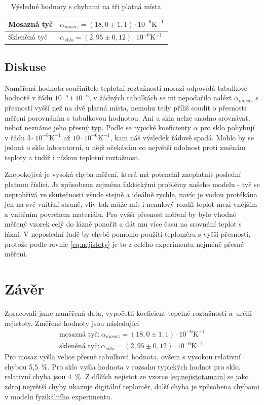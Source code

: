 \documentclass[a4paper,12pt]{article}   %
\begin{document}
\begin{table}[htbp]
  \centering
  \begin{tabular}{|l|l|}
    \hline
    Mosazná tyč & $\alpha_{mosaz} = (18,0 \pm 1,1) \cdot 10^{-6} \text{K}^{-1}$\\\hline
    Skleněná tyč & $\alpha_{sklo} = (2,95 \pm 0,12) \cdot 10^{-6} \text{K}^{-1}$\\\hline
  \end{tabular}
  \caption{Výsledné hodnoty s chybami na tři platná místa}
  \label{tab:final}
\end{table}

\subsection{Diskuse}
\label{ch:diskuze}
Naměřená hodnota součinitele teplotní roztažnosti mosazi odpovídá tabulkové hodnotě v řádu $10^{-5}$ i $10^{-6}$, v žádných tabulkách se mi nepodařilo nalézt $\alpha_{mosaz}$ s přesností vyšší než na dvě platná místa, nemohu tedy příliš soudit o přesnosti měření porovnáním s tabulkovou hodnotou. Ani u skla nelze snadno srovnávat, neboť neznáme jeho přesný typ. Podle \cite{url:sklo} se typické koeficienty $\alpha$ pro sklo pohybují v řádu $3\cdot 10^{-6} \text{K}^{-1}$ až $10 \cdot 10^{-6}\text{K}^{-1}$, kam náš výsledek řádově spadá. Mohlo by se jednat o sklo laboratorní, u nějž očekávám co největší odolnost proti změnám teploty a tudíž i nízkou teplotní roztažnost.

Znepokojivá je vysoká chyba měření, která má potenciál zneplatnit poslední platnou číslici. Je způsobena zejména faktickými problémy našeho modelu - tyč se neprohřívá ve skutečnosti všude stejně a ideálně rychle, navíc je vodou protékána jen na své vnitřní straně, vliv tak může mít i nenulový rozdíl teplot mezi vnějším a vnitřním povrchem materiálu. Pro vyšší přesnost měření by bylo vhodné měřený vzorek celý do lázně ponořit a dát mu více času na srovnání teplot s lázní. V neposlední řadě by chybě pomohlo použití teploměru s vyšší přesností, protože podle rovnic \eqref{eq:nejistoty} je to z celého experimentu nejméně přesné měření.

\section{Závěr}
\label{ch:zaver}
Zpracovali jsme naměřená data, vypočetli koeficient tepelné roztažnosti a~určili nejistoty. Změřené hodnoty jsou následující
\begin{equation*}
  \begin{split}
    \text{mosazná tyč:}~\alpha_{mosaz} = (18,0 \pm 1,1) \cdot 10^{-6} \text{K}^{-1} \\
    \text{skleněná tyč:}~\alpha_{sklo} = (2,95 \pm 0,12) \cdot 10^{-6} \text{K}^{-1}
  \end{split}
\end{equation*}
Pro mosaz vyšla velice přesně tabulková hodnota, ovšem s vysokou relativní chybou 5,5~\%. Pro sklo vyšla hodnota v rozsahu typických hodnot pro sklo, relativní chyba jsou 4~\%. Z dílčích nejistot ze vzorce \ref{eq:nejistotamain} se jako zdroj největší chyby ukazuje digitální teploměr, další chyba je způsobena chybami v modelu fyzikálního experimentu.
\end{document}
